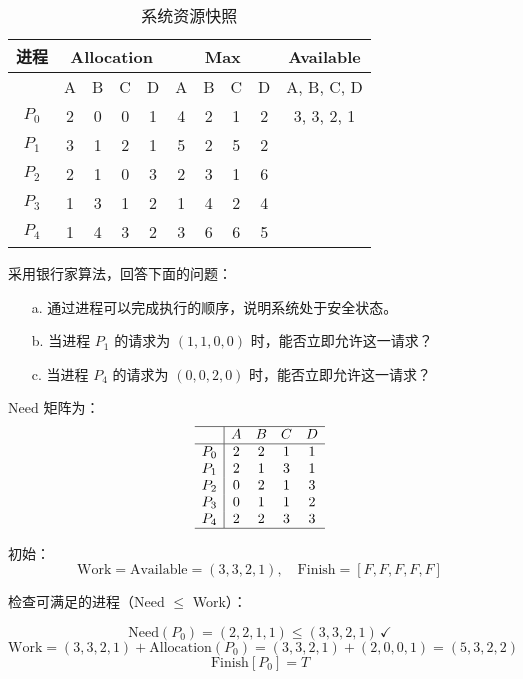 \documentclass[UTF8]{homework}
\begin{document}
\begin{homeworkProblem}
\begin{table}[H]
    \centering
    \renewcommand{\arraystretch}{1.5} %
    \begin{tabular}{|c|c|c|c|c|c|c|c|c|c|}
    \hline
    \textbf{进程} & \multicolumn{4}{|c|}{\textbf{Allocation}} & \multicolumn{4}{|c|}{\textbf{Max}} & \textbf{Available} \\ \hline
     & A & B & C & D & A & B & C & D & A, B, C, D \\ \hline
    $P_0$ & 2 & 0 & 0 & 1 & 4 & 2 & 1 & 2 & 3, 3, 2, 1 \\ \hline
    $P_1$ & 3 & 1 & 2 & 1 & 5 & 2 & 5 & 2 & \\ \hline
    $P_2$ & 2 & 1 & 0 & 3 & 2 & 3 & 1 & 6 & \\ \hline
    $P_3$ & 1 & 3 & 1 & 2 & 1 & 4 & 2 & 4 & \\ \hline
    $P_4$ & 1 & 4 & 3 & 2 & 3 & 6 & 6 & 5 & \\ \hline
    \end{tabular}
    \caption{系统资源快照}
    \end{table}

采用银行家算法，回答下面的问题：

\begin{enumerate}
    \item[a.] 通过进程可以完成执行的顺序，说明系统处于安全状态。
    \item[b.] 当进程 $P_1$ 的请求为 $(1, 1, 0, 0)$ 时，能否立即允许这一请求？
    \item[c.] 当进程 $P_4$ 的请求为 $(0, 0, 2, 0)$ 时，能否立即允许这一请求？
\end{enumerate}

\solution

$\text{Need}$ 矩阵为：
\[
\begin{array}{c|cccc}
\hline
   & A & B & C & D \\ \hline
P_0 & 2 & 2 & 1 & 1 \\
P_1 & 2 & 1 & 3 & 1 \\
P_2 & 0 & 2 & 1 & 3 \\
P_3 & 0 & 1 & 1 & 2 \\
P_4 & 2 & 2 & 3 & 3 \\
\hline
\end{array}
\]


初始：
\[
\text{Work} = \text{Available} = (3,3,2,1), \quad \text{Finish} = [F,F,F,F,F]
\]

检查可满足的进程（Need $\leq$ Work）：

   \[
   \text{Need}(P_0) = (2,2,1,1) \leq (3,3,2,1)\, \checkmark
   \]
   \[
   \text{Work} = (3,3,2,1) + \text{Allocation}(P_0) = (3,3,2,1)+(2,0,0,1) = (5,3,2,2)
   \]
   \[
   \text{Finish}[P_0] = T
   \]


\end{homeworkProblem}
\end{document}
